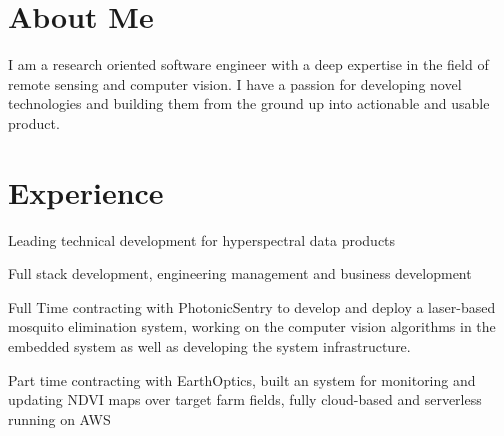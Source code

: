 \documentclass[]{nilosek-resume}
\begin{document}
\begin{minipage}[t]{0.7\textwidth} 


\section{About Me}
I am a research oriented software engineer with a deep expertise in the field of remote sensing and computer vision. I have a passion for developing novel technologies and building them from the ground up into actionable and usable product.


\section{Experience}
\vspace{\topsep} %
\begin{tightemize}
	\item Leading technical development for hyperspectral data products
	\item Full stack development, engineering management and business development
\end{tightemize}
\sectionsep

\vspace{\topsep} %
\begin{tightemize}
	\item Full Time contracting with PhotonicSentry to develop and deploy a laser-based mosquito elimination system, working on the computer vision algorithms in the embedded system as well as developing the system infrastructure.
	\item Part time contracting with EarthOptics, built an system for monitoring and updating NDVI maps over target farm fields, fully cloud-based and serverless running on AWS
\end{tightemize}
\sectionsep


\end{minipage}
\end{document}
